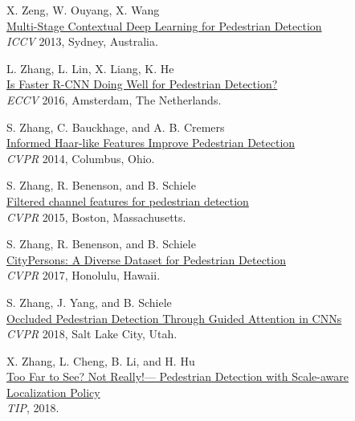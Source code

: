 \documentclass[onecolumn]{article}
\begin{document}
\begin{thebibliography}{1}
X. Zeng, W. Ouyang, X. Wang\\
\href{http://www.ee.cuhk.edu.hk/~xgwang/papers/zengOWiccv13.pdf}{
Multi-Stage Contextual Deep Learning for Pedestrian Detection}\\
\textit{ICCV} 2013, Sydney, Australia.

L. Zhang, L. Lin, X. Liang, K. He\\
\href{http://kaiminghe.com/publications/eccv16ped.pdf}{
Is Faster R-CNN Doing Well for Pedestrian Detection?}\\
\textit{ECCV} 2016, Amsterdam, The Netherlands.

S. Zhang, C. Bauckhage, and A. B. Cremers\\
\href{http://www.iai.uni-bonn.de/~zhangs/Shanshan_CVPR2014.pdf}{
Informed Haar-like Features Improve Pedestrian Detection}\\
\textit{CVPR} 2014, Columbus, Ohio.

S. Zhang, R. Benenson, and B. Schiele\\
\href{http://arxiv.org/abs/1501.05759}{
Filtered channel features for pedestrian detection}\\
\textit{CVPR} 2015, Boston, Massachusetts.

S. Zhang, R. Benenson, and B. Schiele\\
\href{http://openaccess.thecvf.com/content_cvpr_2017/papers/Zhang_CityPersons_A_Diverse_CVPR_2017_paper.pdf}{
CityPersons: A Diverse Dataset for Pedestrian Detection}\\
\textit{CVPR} 2017, Honolulu, Hawaii.

S. Zhang, J. Yang, and B. Schiele\\
\href{http://openaccess.thecvf.com/content_cvpr_2018/html/Zhang_Occluded_Pedestrian_Detection_CVPR_2018_paper.html}{
Occluded Pedestrian Detection Through Guided Attention in CNNs}\\
\textit{CVPR} 2018, Salt Lake City, Utah.

X. Zhang, L. Cheng, B. Li, and H. Hu\\
\href{https://ieeexplore.ieee.org/abstract/document/8328854}{
Too Far to See? Not Really!— Pedestrian Detection with Scale-aware Localization Policy}\\
\textit{TIP}, 2018.

\end{thebibliography}

\end{document}
